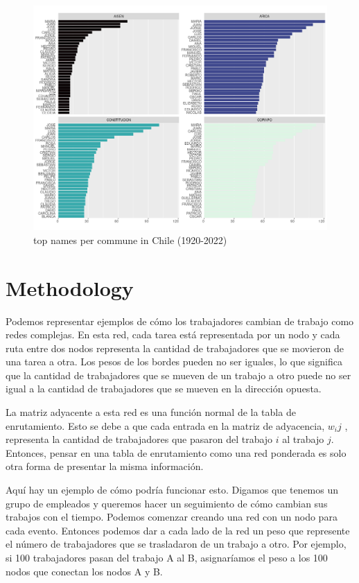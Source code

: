 \begin{figure}[H]
    \centering
    \includegraphics[width=13cm]{plot/top_nombre_comuna2.png}
    \caption{top names per commune in Chile (1920-2022)}
    \label{}
\end{figure}


\section{Methodology}

Podemos representar ejemplos de cómo los trabajadores cambian de trabajo como redes complejas. En esta red, cada tarea está representada por un nodo y cada ruta entre dos nodos representa la cantidad de trabajadores que se movieron de una tarea a otra. Los pesos de los bordes pueden no ser iguales, lo que significa que la cantidad de trabajadores que se mueven de un trabajo a otro puede no ser igual a la cantidad de trabajadores que se mueven en la dirección opuesta.

La matriz adyacente a esta red es una función normal de la tabla de enrutamiento. Esto se debe a que cada entrada en la matriz de adyacencia, \(w_ij \)  , representa la cantidad de trabajadores que pasaron del trabajo \( i\) al trabajo \( j \). Entonces, pensar en una tabla de enrutamiento como una red ponderada es solo otra forma de presentar la misma información.

Aquí hay un ejemplo de cómo podría funcionar esto. Digamos que tenemos un grupo de empleados y queremos hacer un seguimiento de cómo cambian sus trabajos con el tiempo. Podemos comenzar creando una red con un nodo para cada evento. Entonces podemos dar a cada lado de la red un peso que represente el número de trabajadores que se trasladaron de un trabajo a otro. Por ejemplo, si 100 trabajadores pasan del trabajo A al B, asignaríamos el peso a los 100 nodos que conectan los nodos A y B.

